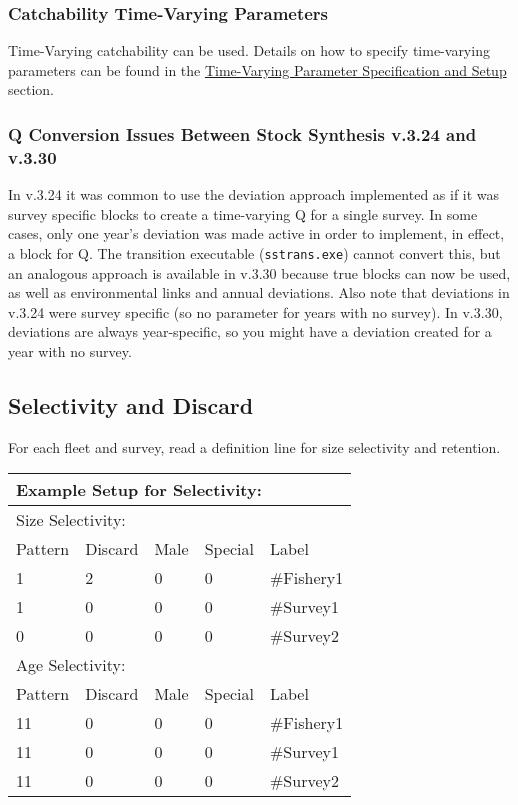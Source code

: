 \subsubsection{Catchability Time-Varying Parameters}
Time-Varying catchability can be used. Details on how to specify time-varying parameters can be found in the \hyperlink{tvOrder}{Time-Varying Parameter Specification and Setup} section.

\subsubsection{Q Conversion Issues Between Stock Synthesis v.3.24 and v.3.30}
In v.3.24 it was common to use the deviation approach implemented as if it was survey specific blocks to create a time-varying Q for a single survey. In some cases, only one year's deviation was made active in order to implement, in effect, a block for Q. The transition executable (\verb|sstrans.exe|) cannot convert this, but an analogous approach is available in v.3.30 because true blocks can now be used, as well as environmental links and annual deviations. Also note that deviations in v.3.24 were survey specific (so no parameter for years with no survey). In v.3.30, deviations are always year-specific, so you might have a deviation created for a year with no survey.

\subsection{Selectivity and Discard}
For each fleet and survey, read a definition line for size selectivity and retention. 

\begin{center}
	\begin{longtable}{p{2cm} p{2cm} p{2cm} p{2cm} p{6.5cm}}
		\multicolumn{5}{l}{Example Setup for Selectivity:} \Tstrut\\
		\hline
		\multicolumn{5}{l}{Size Selectivity:} \Tstrut\\
		Pattern & Discard & Male & Special & Label \Bstrut\\
		\hline
		1 & 2 & 0 & 0 & \#Fishery1 \Tstrut\\
		1 & 0 & 0 & 0 & \#Survey1 \\
		0 & 0 & 0 & 0 & \#Survey2 \Bstrut\\
		\hline
		
		\multicolumn{5}{l}{Age Selectivity:} \Tstrut\\
		Pattern & Discard & Male & Special & Label \Bstrut\\
		\hline
		11 & 0 & 0 & 0 & \#Fishery1 \Tstrut\\
		11 & 0 & 0 & 0 & \#Survey1 \\
		11 & 0 & 0 & 0 & \#Survey2 \Bstrut\\
		\hline
	\end{longtable}
\end{center}

